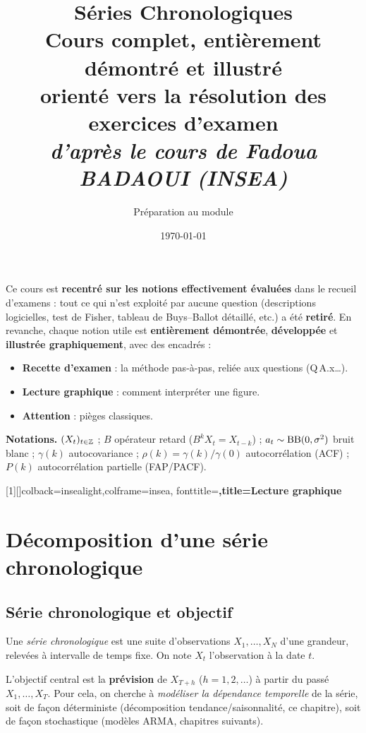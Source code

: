 \documentclass[11pt]{report}
\title{\vspace{-1.5cm}\textbf{\color{insea}Séries Chronologiques}\\[3mm]
\large Cours complet, entièrement démontré et illustré\\[1mm]
\normalsize orienté vers la résolution des exercices d'examen\\[2mm]
\normalsize\itshape d'après le cours de Fadoua BADAOUI (INSEA)}
\author{Préparation au module}
\date{\today}
\begin{document}
\maketitle
\thispagestyle{empty}

\begin{tcolorbox}[colback=insealight,colframe=insea,title={Esprit de ce cours}]
Ce cours est \textbf{recentré sur les notions effectivement évaluées} dans le recueil
d'examens : tout ce qui n'est exploité par aucune question (descriptions logicielles,
test de Fisher, tableau de Buys--Ballot détaillé, etc.) a été \textbf{retiré}. En revanche,
chaque notion utile est \textbf{entièrement démontrée}, \textbf{développée} et
\textbf{illustrée graphiquement}, avec des encadrés :
\begin{itemize}[leftmargin=*,nosep]
\item \textbf{\color{vert}Recette d'examen} : la méthode pas-à-pas, reliée aux questions (Q\,A.x\dots).
\item \textbf{\color{insea}Lecture graphique} : comment interpréter une figure.
\item \textbf{\color{orange}Attention} : pièges classiques.
\end{itemize}
\noindent\textbf{Notations.} $(X_t)_{t\in\mathbb{Z}}$ ; $B$ opérateur retard ($B^kX_t=X_{t-k}$) ;
$a_t\sim\operatorname{BB}(0,\sigma^2)$ bruit blanc ; $\gamma(k)$ autocovariance ; $\rho(k)=\gamma(k)/\gamma(0)$
autocorrélation (ACF) ; $P(k)$ autocorrélation partielle (FAP/PACF).
\end{tcolorbox}

[1][]{colback=insealight,colframe=insea,
  fonttitle=\bfseries,title={Lecture graphique}}

\tableofcontents

\chapter{Décomposition d'une série chronologique}

\section{Série chronologique et objectif}
\begin{definition}
Une \emph{série chronologique} est une suite d'observations $X_1,\dots,X_N$ d'une grandeur,
relevées à intervalle de temps fixe. On note $X_t$ l'observation à la date $t$.
\end{definition}
L'objectif central est la \textbf{prévision} de $X_{T+h}$ ($h=1,2,\dots$) à partir du passé
$X_1,\dots,X_T$. Pour cela, on cherche à \emph{modéliser la dépendance temporelle} de la
série, soit de façon déterministe (décomposition tendance/saisonnalité, ce chapitre), soit de
façon stochastique (modèles ARMA, chapitres suivants).
\end{document}
